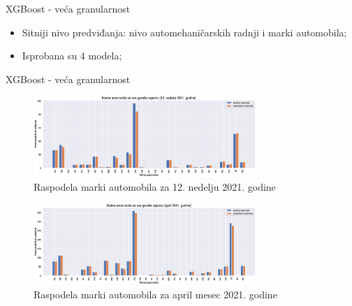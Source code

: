 \documentclass{beamer}
\begin{document}
\begin{frame}{XGBoost - veća granularnost}
\begin{itemize}
    \item  Sitniji nivo predviđanja: nivo automehaničarskih radnji i marki automobila;
    \item Isprobana su 4 modela;
\end{itemize}

\begin{table}
\centering
\caption{XGBoost metrike evaluacije za 4 modela}
\label{tbl: xgboost_atributi}
\end{table}
\end{frame}

\begin{frame}{XGBoost - veća granularnost}

\begin{figure}[!ht]
  \centering
  \includegraphics[width=0.75\textwidth]{./images/grafici/year_week_garage_make_train_on_all_available_202112.eps}
  \vspace{-10px}
  \caption{\footnotesize{Raspodela marki automobila za 12. nedelju 2021. godine}}
  \label{fig: marke_nedelja}
\end{figure}
\vspace{-17px}
\begin{figure}[!ht]
  \centering
  \includegraphics[width=0.75\textwidth]{./images/grafici/year_month_garage_make_train_on_all_available_202104.eps}
  \vspace{-10px}
  \caption{\footnotesize{Raspodela marki automobila za april mesec 2021. godine}}
  \label{fig: marke_mesec}
\end{figure}

\end{frame}
\end{document}
